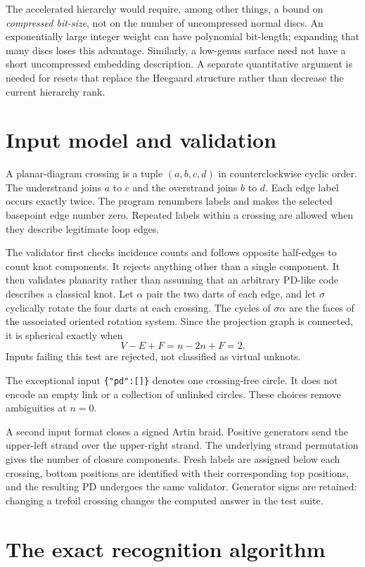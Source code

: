 \documentclass[11pt]{article}
\theoremstyle{definition}\newtheorem{definition}[theorem]{Definition}
\begin{document}
The accelerated hierarchy would require, among other things, a bound on
\emph{compressed bit-size}, not on the number of uncompressed normal discs.
An exponentially large integer weight can have polynomial bit-length;
expanding that many discs loses this advantage. Similarly, a low-genus surface
need not have a short uncompressed embedding description. A separate
quantitative argument is needed for resets that replace the Heegaard structure
rather than decrease the current hierarchy rank.

\section{Input model and validation}

A planar-diagram crossing is a tuple $(a,b,c,d)$ in counterclockwise cyclic
order. The understrand joins $a$ to $c$ and the overstrand joins $b$ to $d$.
Each edge label occurs exactly twice. The program renumbers labels and makes
the selected basepoint edge number zero. Repeated labels within a crossing
are allowed when they describe legitimate loop edges.

The validator first checks incidence counts and follows opposite half-edges
to count knot components. It rejects anything other than a single component.
It then validates planarity rather than assuming that an arbitrary PD-like
code describes a classical knot. Let $\alpha$ pair the two darts of each edge,
and let $\sigma$ cyclically rotate the four darts at each crossing. The cycles
of $\sigma\alpha$ are the faces of the associated oriented rotation system.
Since the projection graph is connected, it is spherical exactly when
\[
 V-E+F=n-2n+F=2.
\]
Inputs failing this test are rejected, not classified as virtual unknots.

The exceptional input \texttt{\{"pd":[]\}} denotes one crossing-free circle.
It does not encode an empty link or a collection of unlinked circles. These
choices remove ambiguities at $n=0$.

A second input format closes a signed Artin braid. Positive generators send
the upper-left strand over the upper-right strand. The underlying strand
permutation gives the number of closure components. Fresh labels are assigned
below each crossing, bottom positions are identified with their corresponding
top positions, and the resulting PD undergoes the same validator. Generator
signs are retained: changing a trefoil crossing changes the computed answer in
the test suite.

\section{The exact recognition algorithm}
\end{document}
